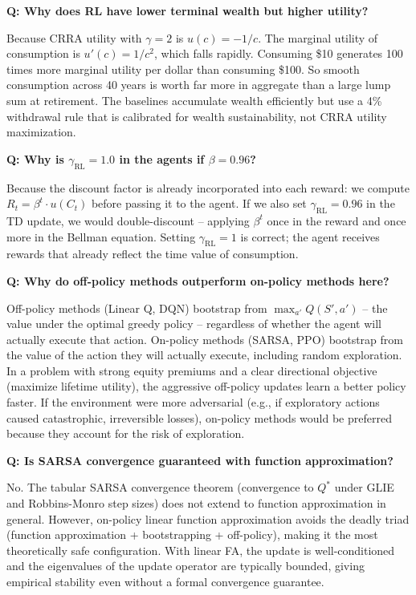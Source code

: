 \documentclass[11pt, letterpaper]{article}
\begin{document}
\textbf{Q: Why does RL have lower terminal wealth but higher utility?}

Because CRRA utility with $\gamma=2$ is $u(c) = -1/c$. The marginal utility of consumption is $u'(c) = 1/c^2$, which falls rapidly. Consuming \$10 generates 100 times more marginal utility per dollar than consuming \$100. So smooth consumption across 40 years is worth far more in aggregate than a large lump sum at retirement. The baselines accumulate wealth efficiently but use a 4\% withdrawal rule that is calibrated for wealth sustainability, not CRRA utility maximization.

\textbf{Q: Why is $\gamma_{\text{RL}} = 1.0$ in the agents if $\beta = 0.96$?}

Because the discount factor is already incorporated into each reward: we compute $R_t = \beta^t \cdot u(C_t)$ before passing it to the agent. If we also set $\gamma_{\text{RL}} = 0.96$ in the TD update, we would double-discount -- applying $\beta^t$ once in the reward and once more in the Bellman equation. Setting $\gamma_{\text{RL}} = 1$ is correct; the agent receives rewards that already reflect the time value of consumption.

\textbf{Q: Why do off-policy methods outperform on-policy methods here?}

Off-policy methods (Linear Q, DQN) bootstrap from $\max_{a'} Q(S', a')$ -- the value under the optimal greedy policy -- regardless of whether the agent will actually execute that action. On-policy methods (SARSA, PPO) bootstrap from the value of the action they will actually execute, including random exploration. In a problem with strong equity premiums and a clear directional objective (maximize lifetime utility), the aggressive off-policy updates learn a better policy faster. If the environment were more adversarial (e.g., if exploratory actions caused catastrophic, irreversible losses), on-policy methods would be preferred because they account for the risk of exploration.

\textbf{Q: Is SARSA convergence guaranteed with function approximation?}

No. The tabular SARSA convergence theorem (convergence to $Q^*$ under GLIE and Robbins-Monro step sizes) does not extend to function approximation in general. However, on-policy linear function approximation avoids the deadly triad (function approximation + bootstrapping + off-policy), making it the most theoretically safe configuration. With linear FA, the update is well-conditioned and the eigenvalues of the update operator are typically bounded, giving empirical stability even without a formal convergence guarantee.
\end{document}
